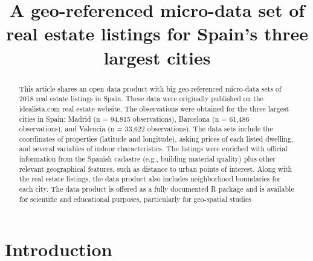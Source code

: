 \documentclass[Royal,times,sageh]{sagej}
\begin{document}

\title{A geo-referenced micro-data set of real estate listings for
Spain's three largest cities}


\author{\affilnum{}}

\affiliation{}



\begin{abstract}
This article shares an open data product with big geo-referenced
micro-data sets of 2018 real estate listings in Spain. These data were
originally published on the idealista.com real estate website. The
observations were obtained for the three largest cities in Spain: Madrid
(n = 94,815 observations), Barcelona (n = 61,486 observations), and
Valencia (n = 33,622 observations). The data sets include the
coordinates of properties (latitude and longitude), asking prices of
each listed dwelling, and several variables of indoor characteristics.
The listings were enriched with official information from the Spanish
cadastre (e.g., building material quality) plus other relevant
geographical features, such as distance to urban points of interest.
Along with the real estate listings, the data product also includes
neighborhood boundaries for each city. The data product is offered as a
fully documented R package and is available for scientific and
educational purposes, particularly for geo-spatial studies
\end{abstract}


\maketitle

\hypertarget{introduction}{%
\section{Introduction}\label{introduction}}
\end{document}
